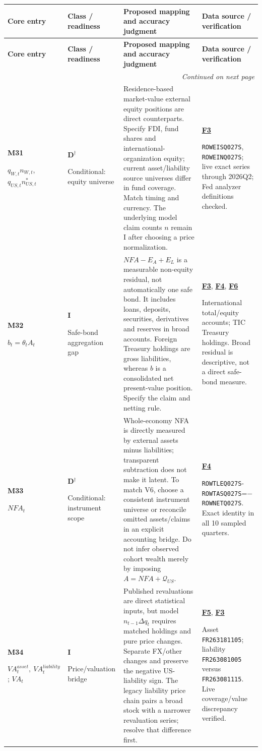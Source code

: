 \documentclass[10pt,a4paper,landscape]{article}
\makeatletter
\newcommand{\code}[1]{{\footnotesize\texttt{#1}}}
\newenvironment{measuretable}{%
\fontsize{9.4}{10.8}\selectfont\setlength{\parskip}{1pt}
\begin{longtable}{@{}P{\dimexpr .14\textwidth-4.2pt\relax}P{\dimexpr .135\textwidth-4.05pt\relax}P{\dimexpr .455\textwidth-13.65pt\relax}P{\dimexpr .27\textwidth-8.1pt\relax}@{}}
\toprule\rowcolor{tablehead}\textbf{Core entry} & \textbf{Class / readiness} & \textbf{Proposed mapping and accuracy judgment} & \textbf{Data source / verification}\\\midrule
\endfirsthead
\toprule\rowcolor{tablehead}\textbf{Core entry} & \textbf{Class / readiness} & \textbf{Proposed mapping and accuracy judgment} & \textbf{Data source / verification}\\\midrule
\endhead\midrule\multicolumn{4}{r}{\footnotesize\itshape Continued on next page}\\\endfoot
\bottomrule\endlastfoot
}{\end{longtable}}
\makeatother
\begin{document}
\begin{measuretable}
\textbf{M31}\par $q_{W,t}n_{W,t}$, $q_{US,t}n_{US,t}^*$ & \textbf{D}$^\dagger$\par Conditional: equity universe & Residence-based market-value external equity positions are direct counterparts. Specify FDI, fund shares and international-organization equity; current asset/liability source universes differ in fund coverage. Match timing and currency. The underlying model claim counts $n$ remain I after choosing a price normalization. & \hyperlink{src-F3}{\textbf{F3}}\par \code{ROWEISQ027S}, \code{ROWEINQ027S}; live exact series through 2026Q2; Fed analyzer definitions checked.\\[4pt]
\textbf{M32}\par $b_t=\theta_tA_t$ & \textbf{I}\par Safe-bond aggregation gap & $NFA-E_A+E_L$ is a measurable non-equity residual, not automatically one safe bond. It includes loans, deposits, securities, derivatives and reserves in broad accounts. Foreign Treasury holdings are gross liabilities, whereas $b$ is a consolidated net present-value position. Specify the claim and netting rule. & \hyperlink{src-F3}{\textbf{F3}}, \hyperlink{src-F4}{\textbf{F4}}, \hyperlink{src-F6}{\textbf{F6}}\par International total/equity accounts; TIC Treasury holdings. Broad residual is descriptive, not a direct safe-bond measure.\\[4pt]
\textbf{M33}\par $NFA_t$ & \textbf{D}$^\dagger$\par Conditional: instrument scope & Whole-economy NFA is directly measured by external assets minus liabilities; transparent subtraction does not make it latent. To match V6, choose a consistent instrument universe or reconcile omitted assets/claims in an explicit accounting bridge. Do not infer observed cohort wealth merely by imposing $A=NFA+\mathcal Q_{US}$. & \hyperlink{src-F4}{\textbf{F4}}\par \code{ROWTLEQ027S}-\code{ROWTASQ027S}=$-$\code{ROWNETQ027S}. Exact identity in all 10 sampled quarters.\\[4pt]
\textbf{M34}\par $VA_t^{asset},\ VA_t^{liability}$; $VA_t$ & \textbf{I}\par Price/valuation bridge & Published revaluations are direct statistical inputs, but model $n_{t-1}\Delta q_t$ requires matched holdings and pure price changes. Separate FX/other changes and preserve the negative US-liability sign. The legacy liability price chain pairs a broad stock with a narrower revaluation series; resolve that difference first. & \hyperlink{src-F5}{\textbf{F5}}, \hyperlink{src-F3}{\textbf{F3}}\par Asset \code{FR263181105}; liability \code{FR263081005} versus \code{FR263081115}. Live coverage/value discrepancy verified.\\[4pt]

\end{measuretable}
\end{document}
